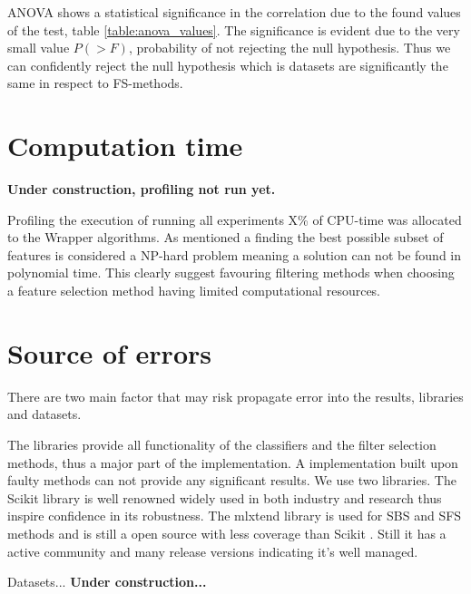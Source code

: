 ANOVA shows a statistical significance in the correlation due to the found values of the test, table \ref{table:anova_values}. The significance is evident due to the very small value $P(>F)$, probability of not rejecting the null hypothesis. Thus we can confidently reject the null hypothesis which is datasets are significantly the same in respect to FS-methods.







\section{Computation time}

\textbf{Under construction, profiling not run yet.}

Profiling the execution of running all experiments X\% of CPU-time was allocated to the Wrapper algorithms. As mentioned a finding the best possible subset of features is considered a NP-hard problem meaning a solution can not be found in polynomial time. This clearly suggest favouring filtering methods when choosing a feature selection method having limited computational resources.

\section{Source of errors}
\label{sec:source_of_errors}

There are two main factor that may risk propagate error into the results, libraries and datasets.

The libraries provide all functionality of the classifiers and the filter selection methods, thus a major part of the implementation. A implementation built upon faulty methods can not provide any significant results. We use two libraries. The Scikit library \parencite{scikit-learn} is well renowned widely used in both industry and research thus inspire confidence in its robustness. The mlxtend library is used for SBS and SFS methods and is still a open source with less coverage than Scikit \parencite{mlextend}. Still it has a active community and many release versions indicating it's well managed.

Datasets... \textbf{Under construction...}

